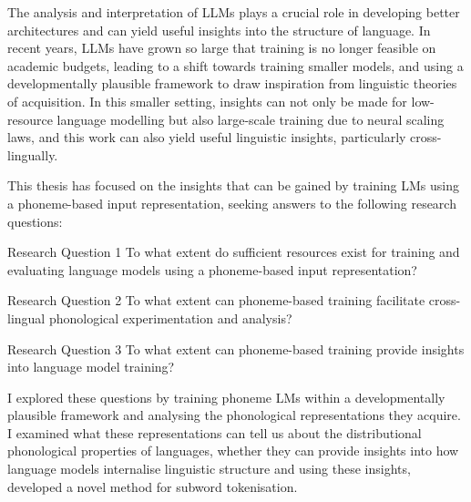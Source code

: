 The analysis and interpretation of LLMs plays a crucial role in developing better architectures and can yield useful insights into the structure of language. In recent years, LLMs have grown so large that training is no longer feasible on academic budgets, leading to a shift towards training smaller models, and using a developmentally plausible framework to draw inspiration from linguistic theories of acquisition. In this smaller setting, insights can not only be made for low-resource language modelling but also large-scale training due to neural scaling laws, and this work can also yield useful linguistic insights, particularly cross-lingually.

This thesis has focused on the insights that can be gained by training LMs using a phoneme-based input representation, seeking answers to the following research questions:

\begin{repeatquestion}{Research Question 1}
    To what extent do sufficient resources exist for training and evaluating language models using a phoneme-based input representation?
\end{repeatquestion}

\begin{repeatquestion}{Research Question 2}
    To what extent can phoneme-based training facilitate cross-lingual phonological experimentation and analysis?
\end{repeatquestion}

\begin{repeatquestion}{Research Question 3}
    To what extent can phoneme-based training provide insights into language model training?
\end{repeatquestion}

I explored these questions by training phoneme LMs within a developmentally plausible framework and analysing the phonological representations they acquire. I examined what these representations can tell us about the distributional phonological properties of languages, whether they can provide insights into how language models internalise linguistic structure and using these insights, developed a novel method for subword tokenisation. %

